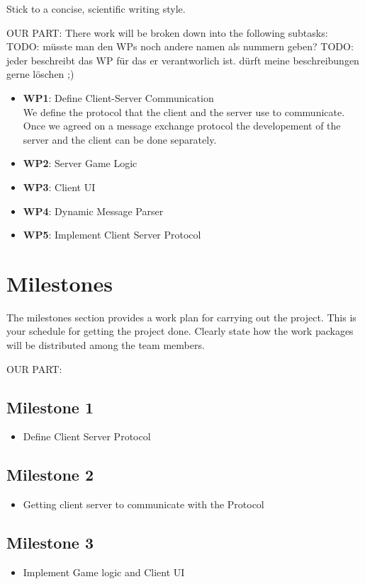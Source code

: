 \documentclass{report}
\begin{document}
Stick to a concise, scientific writing style. 

OUR PART:
There work will be broken down into the following subtasks:
TODO: müsste man den WPs noch andere namen als nummern geben?
TODO: jeder beschreibt das WP für das er verantworlich ist. dürft meine beschreibungen gerne löschen ;)
\begin{itemize}
        \item {\bf WP1}: Define Client-Server Communication\\
        We define the protocol that the client and the server use to communicate. Once we agreed on a message exchange protocol the developement of the server and the client can be done separately.
        \item {\bf WP2}: Server Game Logic\\
        
           
        \item {\bf WP3}: Client UI
        \item {\bf WP4}: Dynamic Message Parser
        \item {\bf WP5}: Implement Client Server Protocol
\end{itemize}

\section{Milestones}
The milestones section provides a work plan for carrying out the project.
This is your schedule for getting the project done.
Clearly state how the work packages will be distributed among the team members. 

OUR PART:

\subsection{Milestone 1}
\begin{itemize}
	\item Define Client Server Protocol
\end{itemize}

\subsection{Milestone 2}
\begin{itemize}
	\item Getting client server to communicate with the Protocol
\end{itemize}

\subsection{Milestone 3}
\begin{itemize}
	\item Implement Game logic and Client UI
\end{itemize}
\end{document}
